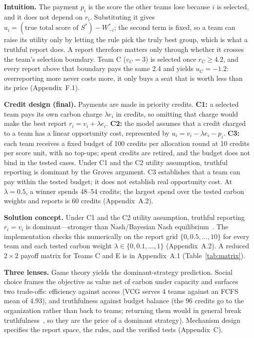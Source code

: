 \vspace{3pt}

\noindent
\textbf{Intuition.} The payment $p_i$ is the score the other teams lose because $i$ is selected, and it does not depend on $r_i$. Substituting it gives $u_i = (\text{true total score of } S^*) - W_{-i}^*$; the second term is fixed, so a team can raise its utility only by letting the rule pick the truly best group, which is what a truthful report does. A report therefore matters only through whether it crosses the team's selection boundary. Team C ($v_C=3$) is selected once $r_C\ge 4.2$, and every report above that boundary pays the same 2.4 and yields $u_C=-1.2$: overreporting more never costs more, it only buys a seat that is worth less than its price (Appendix~F.1).

\vspace{3pt}

\noindent
\textbf{Credit design (final).} Payments are made in priority credits. \textbf{C1:} a selected team pays its own carbon charge \ensuremath{\lambda e_i} in credits, so omitting that charge would make the best report \ensuremath{r_i=v_i+\lambda e_i}. \textbf{C2:} the model assumes that a credit charged to a team has a linear opportunity cost, represented by \ensuremath{u_i=v_i-\lambda e_i-p_i}. \textbf{C3:} each team receives a fixed budget of 100 credits per allocation round at 10 credits per score unit, with no top-ups; spent credits are retired, and the budget does not bind in the tested cases. Under C1 and the C2 utility assumption, truthful reporting is dominant by the Groves argument. C3 establishes that a team can pay within the tested budget; it does not establish real opportunity cost. At \ensuremath{\lambda=0.5}, a winner spends 48--54 credits; the largest spend over the tested carbon weights and reports is 60 credits (Appendix~A.2).
\vspace{3pt}

\noindent
\textbf{Solution concept.} Under C1 and the C2 utility assumption, truthful reporting $r_i=v_i$ is dominant---stronger than Nash/Bayesian Nash equilibrium~\cite{nash1950,harsanyi1968}. The implementation checks this numerically on the report grid $\{0,0.5,\dots,10\}$ for every team and each tested carbon weight $\lambda\in\{0,0.1,\dots,1\}$ (Appendix~A.2). A reduced $2\times2$ payoff matrix for Teams C and E is in Appendix~A.1 (Table~\ref{tab:matrix}).

\vspace{3pt}

\noindent
\textbf{Three lenses.} Game theory yields the dominant-strategy prediction. Social choice frames the objective as value net of carbon under capacity and surfaces two trade-offs: efficiency against access (VCG serves 4 teams against an FCFS mean of 4.93), and truthfulness against budget balance (the 96 credits go to the organization rather than back to teams; returning them would in general break truthfulness~\cite{greenlaffont1977}, so they are the price of a dominant strategy). Mechanism design specifies the report space, the rules, and the verified tests (Appendix~C).

